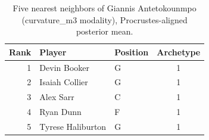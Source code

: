 \begin{table}[htbp]
  \centering\small
  \begin{tabular}{rllc}
    \toprule
    Rank & Player & Position & Archetype \\
    \midrule
    1 & Devin Booker & G & 1 \\
    2 & Isaiah Collier & G & 1 \\
    3 & Alex Sarr & C & 1 \\
    4 & Ryan Dunn & F & 1 \\
    5 & Tyrese Haliburton & G & 1 \\
    \bottomrule
  \end{tabular}
  \caption{Five nearest neighbors of Giannis Antetokounmpo (curvature_m3 modality), Procrustes-aligned posterior mean.}
  \label{tab:Giannis_Antetokounmpo_neighbors_curvature_m3}
\end{table}

